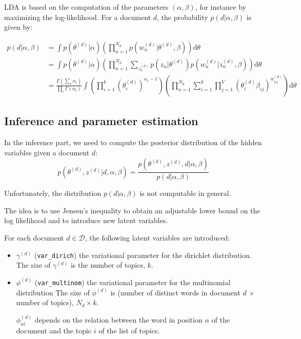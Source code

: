 \documentclass{article}
\begin{document}
LDA is based on the computation of the parameters $(\alpha, \beta)$, for instance by maximizing the log-likelihood. For a document $d$, the probability $p(d|\alpha, \beta)$ is given by:

\begin{align*}
p(d|\alpha, \beta) 
& = \int p(\theta^{(d)}|\alpha) \left( \prod_{n=1}^{N_{d}} p(w_n^{(d)}|\theta^{(d)}, \beta)\right) \text{d}\theta  \\
& = \int p(\theta^{(d)}|\alpha) \left( \prod_{n=1}^{N_{d}} \sum_{z_n^{(d)}} p(z_n|\theta^{(d)}) p(w_n^{(d)}|z_n^{(d)}, \beta)\right) \text{d}\theta  \\
& = \frac{\Gamma\left( \sum_i \alpha_i\right)}{\prod_i \Gamma(\alpha_i)} \int \left( \prod_{i=1}^k (\theta_i^{(d)})^{\alpha_i - 1} \right) \left( \prod_{n=1}^{N_d} \sum_{i=1}^k \prod_{j=1}^V (\theta_i^{(d)} \beta_{ij})^{w_{nj}^{(d)}} \right) \text{d}\theta
\end{align*}

\subsection{Inference and parameter estimation}

In the inference part, we need to compute the posterior distribution of the hidden variables given a document $d$:
\[ p(\theta^{(d)}, z^{(d)} | d, \alpha, \beta) = \frac{p(\theta^{(d)}, z^{(d)}, d | \alpha, \beta)}{p(d | \alpha, \beta)} \]

Unfortunately, the distribution $p(d|\alpha, \beta)$ is not computable in general.

The idea is to use Jensen's inequality to obtain an adjustable lower bound on the log likelihood and to introduce new latent variables.

For each document $d \in \mathcal{D}$, the following latent variables are introduced:
 \begin{itemize}
\setlength\itemsep{-0.2em}
  \item $\gamma^{(d)}$ (\verb"var_dirich") the variational parameter for the dirichlet distribution. The size of $\gamma^{(d)}$ is the number of topics, $k$.
  \item $\phi^{(d)}$ (\verb"var_multinom") the variational parameter for the multinomial distribution The size of $\phi^{(d)}$ is (number of distinct words in document $d$ $\times$ number of topics), $N_d \times k$.
  
  $\phi_{ni}^{(d)}$ depends on the relation between the word in position $n$ of the document and the topic $i$ of the list of topics.
   \end{itemize}
\end{document}

